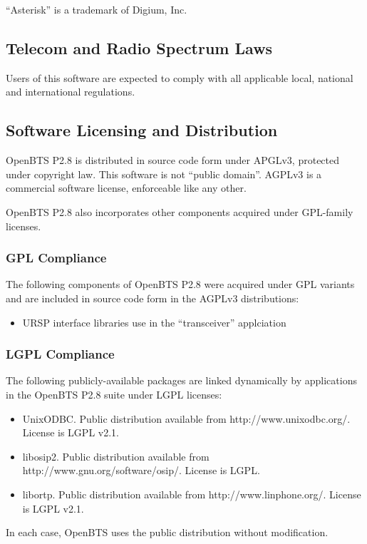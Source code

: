 \documentclass[11pt,openany]{book}
\begin{document}
``Asterisk'' is a trademark of Digium, Inc.

\subsection{Telecom and Radio Spectrum Laws}
Users of this software are expected to comply with all applicable local, national and international
regulations.

\subsection{Software Licensing and Distribution}
OpenBTS P2.8  is distributed in source code form under APGLv3, protected under copyright law. This software is not ``public domain''.  AGPLv3 is a commercial software license, enforceable like any other.

OpenBTS P2.8 also incorporates other components acquired under GPL-family licenses.

\subsubsection{GPL Compliance}
The following components of OpenBTS P2.8 were acquired under GPL variants and are included in source code form in the AGPLv3 distributions:
\begin{itemize}
	\item URSP interface libraries use in the ``transceiver'' applciation
\end{itemize}

\subsubsection{LGPL Compliance}
The following publicly-available packages are linked dynamically by applications in the OpenBTS P2.8 suite under LGPL licenses:
\begin{itemize}
\item UnixODBC.  Public distribution available from http://www.unixodbc.org/.  License is LGPL v2.1.
\item libosip2.  Public distribution available from http://www.gnu.org/software/osip/.  License is LGPL.
\item libortp.  Public distribution available from http://www.linphone.org/.  License is LGPL v2.1.
\end{itemize}
In each case, OpenBTS uses the public distribution without modification.
\end{document}
